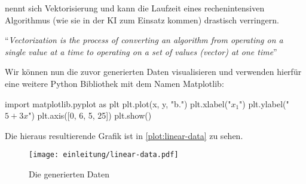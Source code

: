 nennt sich Vektorisierung und kann
die Laufzeit eines rechenintensiven Algorithmus
(wie sie in der KI zum Einsatz kommen) drastisch verringern.
\begin{aquote}{\parencite{online:vectorization}}
  \enquote{\textit{Vectorization is the process of converting an algorithm
      from operating on a single value at a time to
      operating on a set of values (vector) at one time}}
\end{aquote}
Wir können nun die zuvor generierten Daten visualisieren und verwenden hierfür
eine weitere Python Bibliothek mit dem Namen Matplotlib:
\begin{pythoncode}
import matplotlib.pyplot as plt
plt.plot(x, y, "b.")
plt.xlabel("$x_1$")
plt.ylabel("$5 + 3x$")
plt.axis([0, 6, 5, 25])
plt.show()
\end{pythoncode}
\noindent
Die hieraus resultierende Grafik ist in \autoref{plot:linear-data} zu sehen.
\begin{figure}[h!]
  \centering
  \texttt{[image: einleitung/linear-data.pdf]}
  \caption{Die generierten Daten}
  \label{plot:linear-data}
\end{figure}

